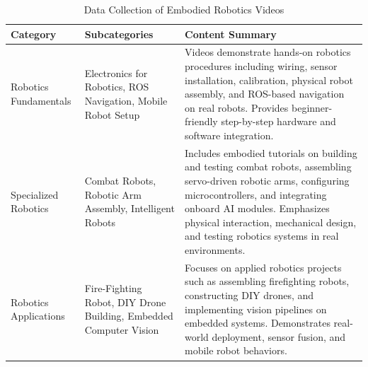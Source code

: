 \documentclass[fleqn,10pt]{JLA_article} %
\begin{document}
\begin{table}[ht]
    \centering
    \caption{Data Collection of Embodied Robotics Videos}
    \begin{tabular}{p{3cm} p{3cm} p{7cm}}
        \toprule
        \textbf{Category} & \textbf{Subcategories} & \textbf{Content Summary} \\
        \midrule

        Robotics Fundamentals
        & Electronics for Robotics, ROS Navigation, Mobile Robot Setup
        & Videos demonstrate hands-on robotics procedures including wiring, sensor installation, calibration, physical robot assembly, and ROS-based navigation on real robots. Provides beginner-friendly step-by-step hardware and software integration. \\[6pt]

        Specialized Robotics
        & Combat Robots, Robotic Arm Assembly, Intelligent Robots
        & Includes embodied tutorials on building and testing combat robots, assembling servo-driven robotic arms, configuring microcontrollers, and integrating onboard AI modules. Emphasizes physical interaction, mechanical design, and testing robotics systems in real environments. \\[6pt]

        Robotics Applications
        & Fire-Fighting Robot, DIY Drone Building, Embedded Computer Vision
        & Focuses on applied robotics projects such as assembling firefighting robots, constructing DIY drones, and implementing vision pipelines on embedded systems. Demonstrates real-world deployment, sensor fusion, and mobile robot behaviors. \\

        \bottomrule
    \end{tabular}
    \label{tab:categorized_videos_emb}
\end{table}
\end{document}
